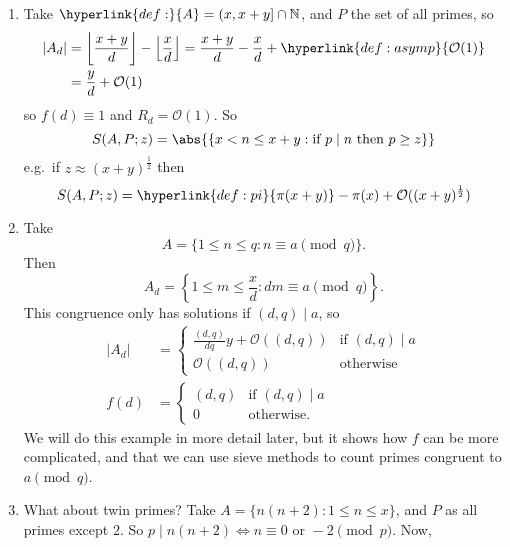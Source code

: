 \documentclass{article}
\newcommand{\bigO}{\mathcal{O}}
\DeclarePairedDelimiter\floor{\lfloor}{\rfloor}
\begin{document}
\begin{eg}\leavevmode
  \begin{enumerate}[label=(\arabic*)]
    \item Take $\hyperlink{def:}{A} = (x, %
      x+y] \cap \mathbb{N}$, and $P$ the set of all primes, so
      \begin{align*}
        |A_d| &= \floor*{\frac{x+y}{d}} - \floor*{\frac{x}{d}} = \frac{x+y}{d} - \frac{x}{d} + \hyperlink{def:asymp}{\bigO(1)} \\
              &= \frac{y}{d} + \bigO(1)
      \end{align*}
      so $f(d) \equiv 1$ and $R_d = \bigO(1)$.
      So
      \begin{equation*}
        S(A,P;z) = \abs{\{x < n \leq x+y : \text{if }p \mid n\text{ then }p \geq z\}}
      \end{equation*}
      e.g.\ if $z \approx (x+y)^{\frac{1}{2}}$ then
      \begin{equation*}
        S(A,P; z) = \hyperlink{def:pi}{\pi(x+y)} - \pi(x) + \bigO((x+y)^{\frac{1}{2}})
      \end{equation*}
    \item Take
      \begin{equation*}A = \{1 \leq n \leq q : n \equiv a \pmod{q}\}.\end{equation*}
      Then
      \begin{equation*}A_d = \left\{1 \leq m \leq \frac{x}{d} : dm \equiv a \pmod{q}\right\}.\end{equation*}
      This congruence only has solutions if $(d,q) \mid a$, so
      \begin{align*}
        |A_d| &=
        \begin{cases}
          \frac{(d,q)}{dq} y + \bigO((d,q)) & \text{if } (d,q) \mid a \\
          \bigO((d,q)) & \text{otherwise}
        \end{cases} \\
        f(d) &=
        \begin{cases}
          (d,q) & \text{if } (d,q) \mid a \\
          0 & \text{otherwise}.
        \end{cases}
      \end{align*}
      We will do this example in more detail later, but it shows how $f$ can be more complicated, and that we can use sieve methods to count primes congruent to $a \pmod{q}$.
    \item What about twin primes? Take $A = \{n(n+2) : 1 \leq n \leq x\}$, and $P$ as all primes except $2$. So $p \mid n(n+2) \iff n \equiv 0 \text{ or } -2 \pmod{p}$. Now,

\end{enumerate}
\end{eg}
\end{document}
